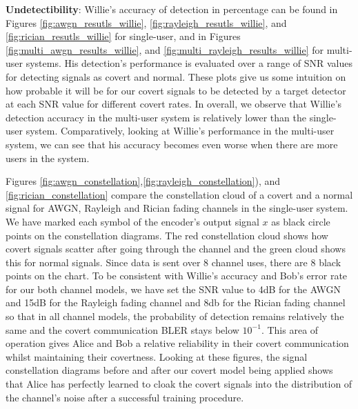 \textbf{Undetectibility}: Willie's accuracy of detection in percentage can be found in Figures \ref{fig:awgn_resutls_willie}, \ref{fig:rayleigh_resutls_willie}, and \ref{fig:rician_resutls_willie} for single-user, and in Figures \ref{fig:multi_awgn_results_willie}, and \ref{fig:multi_rayleigh_results_willie} for multi-user systems. His detection's performance is evaluated over a range of SNR values for detecting signals as covert and normal. These plots give us some intuition on how probable it will be for our covert signals to be detected by a target detector at each SNR value for different covert rates. In overall, we observe that Willie's detection accuracy in the multi-user system is relatively lower than the single-user system. Comparatively, looking at Willie's performance in the multi-user system, we can see that his accuracy becomes even worse when there are more users in the system.  

Figures \ref{fig:awgn_constellation},\ref{fig:rayleigh_constellation}), and \ref{fig:rician_constellation} compare the constellation cloud of a covert and a normal signal for AWGN, Rayleigh and Rician fading channels in the single-user system. We have marked each symbol of the encoder's output signal \(x\) as black circle points on the constellation diagrams. The red constellation cloud shows how covert signals scatter after going through the channel and the green cloud shows this for normal signals. Since data is sent over 8 channel uses, there are 8 black points on the chart. To be consistent with Willie's accuracy and Bob's error rate for our both channel models, we have set the SNR value to 4dB for the AWGN and 15dB for the Rayleigh fading channel and 8db for the Rician fading channel so that in all channel models, the probability of detection remains relatively the same and the covert communication BLER stays below \(10^{-1}\). This area of operation gives Alice and Bob a relative reliability in their covert communication whilst maintaining their covertness. Looking at these figures, the signal constellation diagrams before and after our covert model being applied shows that Alice has perfectly learned to cloak the covert signals into the distribution of the channel's noise after a successful training procedure.


